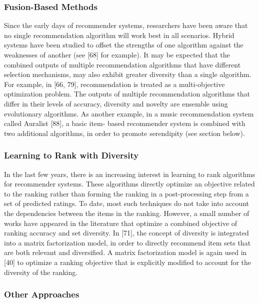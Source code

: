 \subsubsection{Fusion-Based Methods}

Since the early days of recommender systems, researchers have been aware that no single recommendation algorithm will work best in all scenarios. Hybrid systems have been studied to offset the strengths of one algorithm against the weaknesses of another (see [68] for example). It may be expected that the combined outputs of multiple recommendation algorithms that have different selection mechanisms, may also exhibit greater diversity than a single algorithm. For example, in [66, 79], recommendation is treated as a multi-objective optimization problem. The outputs of multiple recommendation algorithms that differ in their levels of accuracy, diversity and novelty are ensemble using evolutionary algorithms. As another example, in a music recommendation system called Auralist [88], a basic item- based recommender system is combined with two additional algorithms, in order to promote serendipity (see section below).

\subsubsection{Learning to Rank with Diversity}

In the last few years, there is an increasing interest in learning to rank algorithms for recommender systems. These algorithms directly optimize an objective related to the ranking rather than forming the ranking in a post-processing step from a set of predicted ratings. To date, most such techniques do not take into account the dependencies between the items in the ranking. However, a small number of works have appeared in the literature that optimize a combined objective of ranking accuracy and set diversity. In [71], the concept of diversity is integrated into a matrix factorization model, in order to directly recommend item sets that are both relevant and diversified. A matrix factorization model is again used in [40] to optimize a ranking objective that is explicitly modified to account for the diversity of the ranking.

\subsubsection{Other Approaches}

